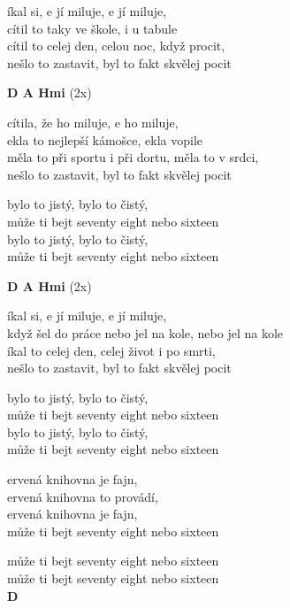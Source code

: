 
\ve{}
íkal si, e jí miluje, e jí miluje,\\
cítil to taky ve škole, i u tabule\\
cítil to celej den, celou noc, když procit,\\
nešlo to zastavit, byl to fakt skvělej pocit

\re{}
{\footnotesize\textbf{D A Hmi}} (2x)

\ve{}
cítila, že ho miluje, e ho miluje,\\
ekla to nejlepší kámošce, ekla vopile\\
měla to při sportu i při dortu, měla to v srdci,\\
nešlo to zastavit, byl to fakt skvělej pocit

\cho{}
bylo to jistý, bylo to čistý,\\
může ti bejt seventy eight nebo sixteen\\
bylo to jistý, bylo to čistý,\\
může ti bejt seventy eight nebo sixteen

\re{}
{\footnotesize\textbf{D A Hmi}} (2x)

\ve{}
íkal si, e jí miluje, e jí miluje,\\
když šel do práce nebo jel na kole, nebo jel na kole\\
íkal to celej den, celej život i po smrti,\\
nešlo to zastavit, byl to fakt skvělej pocit

\cho{}
bylo to jistý, bylo to čistý,\\
může ti bejt seventy eight nebo sixteen\\
bylo to jistý, bylo to čistý,\\
může ti bejt seventy eight nebo sixteen

\ve{}
ervená knihovna je fajn,\\
ervená knihovna to provádí,\\
ervená knihovna je fajn,\\
může ti bejt seventy eight nebo sixteen

\ve{}
může ti bejt seventy eight nebo sixteen\\
může ti bejt seventy eight nebo sixteen\\
{\footnotesize\textbf{D}}

\esong{}
